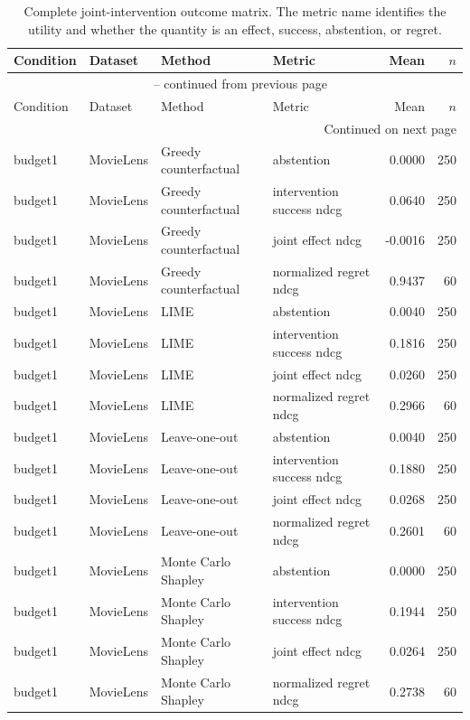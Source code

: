 \begin{longtable}{@{}p{}p{}p{}p{}rr@{}}
\caption{Complete joint-intervention outcome matrix. The metric name identifies the utility and whether the quantity is an effect, success, abstention, or regret.}\label{tab:S2}\\
\toprule
Condition & Dataset & Method & Metric & Mean & $n$ \\
\midrule
\endfirsthead
\multicolumn{6}{c}{\tablename\ \thetable{} -- continued from previous page}\\
\toprule
Condition & Dataset & Method & Metric & Mean & $n$ \\
\midrule
\endhead
\midrule
\multicolumn{6}{r}{Continued on next page}\\
\endfoot
\bottomrule
\endlastfoot
budget1 & MovieLens & Greedy counterfactual & abstention & 0.0000 & 250 \\
budget1 & MovieLens & Greedy counterfactual & intervention success ndcg & 0.0640 & 250 \\
budget1 & MovieLens & Greedy counterfactual & joint effect ndcg & -0.0016 & 250 \\
budget1 & MovieLens & Greedy counterfactual & normalized regret ndcg & 0.9437 & 60 \\
budget1 & MovieLens & LIME & abstention & 0.0040 & 250 \\
budget1 & MovieLens & LIME & intervention success ndcg & 0.1816 & 250 \\
budget1 & MovieLens & LIME & joint effect ndcg & 0.0260 & 250 \\
budget1 & MovieLens & LIME & normalized regret ndcg & 0.2966 & 60 \\
budget1 & MovieLens & Leave-one-out & abstention & 0.0040 & 250 \\
budget1 & MovieLens & Leave-one-out & intervention success ndcg & 0.1880 & 250 \\
budget1 & MovieLens & Leave-one-out & joint effect ndcg & 0.0268 & 250 \\
budget1 & MovieLens & Leave-one-out & normalized regret ndcg & 0.2601 & 60 \\
budget1 & MovieLens & Monte Carlo Shapley & abstention & 0.0000 & 250 \\
budget1 & MovieLens & Monte Carlo Shapley & intervention success ndcg & 0.1944 & 250 \\
budget1 & MovieLens & Monte Carlo Shapley & joint effect ndcg & 0.0264 & 250 \\
budget1 & MovieLens & Monte Carlo Shapley & normalized regret ndcg & 0.2738 & 60 \\

\end{longtable}
